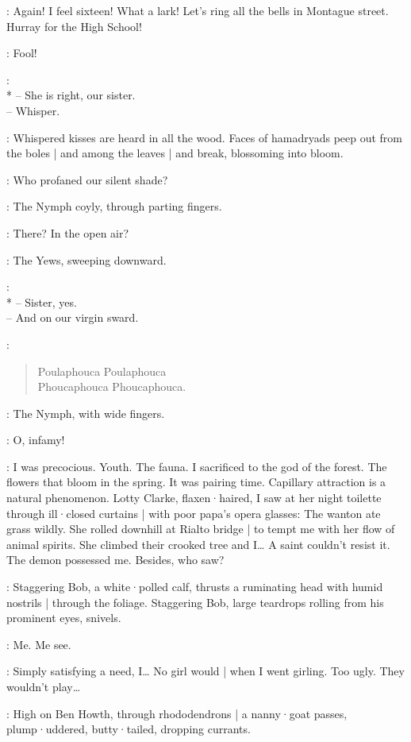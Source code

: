 \Bloom:
Again!
I feel sixteen!
What a lark!
Let's ring all the bells in Montague street.
Hurray for the High School!

\Echo:
Fool!

\Yews:
\\*
-- She is right, our sister.\\
-- Whisper.%

:
Whispered kisses are heard in all the wood.
Faces of hamadryads peep out from the boles |
and among the leaves |
and break,
blossoming into bloom.

\Yews:
Who profaned our silent shade?

:
The Nymph coyly,
through parting fingers.

\Nymph:
There?
In the open air?

:
The Yews,
sweeping downward.

\Yews:\\*
-- Sister, yes.\\
-- And on our virgin sward.

\Waterfall:
\begin{verse}
    Poulaphouca Poulaphouca\\
    Phoucaphouca Phoucaphouca.
\end{verse}

:
The Nymph,
with wide fingers.

\Nymph:
O,
infamy!

\Bloom:
I was precocious.
Youth.
The fauna.
I sacrificed to the god of the forest.
The flowers that bloom in the spring.
It was pairing time.
Capillary attraction is a natural phenomenon.
Lotty Clarke,
flaxen·haired,
I saw at her night toilette through ill·closed curtains |
with poor papa's opera glasses:
The wanton ate grass wildly.
She rolled downhill at Rialto bridge |
to tempt me with her flow of animal spirits.
She climbed their crooked tree and I…
A saint couldn't resist it.
The demon possessed me.
Besides,
who saw?

:
Staggering Bob,
a white·polled calf,
%
thrusts a ruminating head with humid nostrils |
through the foliage.
Staggering Bob,
large teardrops rolling from his prominent eyes,
snivels.

\StaggeringBob:
Me.
Me see.

\Bloom:
Simply satisfying a need,
I…
No girl would |
when I went girling.
Too ugly.
They wouldn't play…

:
High on Ben Howth,
through rhododendrons |
a nanny·goat passes,
plump·uddered,
butty·tailed,
dropping currants.

